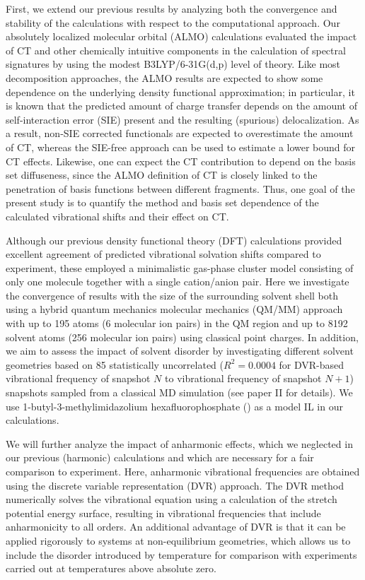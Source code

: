 \documentclass[%
  class = book,%
  crop = false,%
  float = true,%
  multi = true,%
  preview = false,%
]{standalone}
\begin{document}
First, we extend our previous results by analyzing both the convergence and stability of the calculations with respect to the computational approach. Our absolutely localized molecular orbital (ALMO) calculations\cite{Khaliullin2006,Khaliullin2007,Khaliullin2008} evaluated the impact of CT and other chemically intuitive components in the calculation of spectral signatures by using the modest B3LYP/6-31G(d,p) level of theory. Like most decomposition approaches, the ALMO results are expected to show some dependence on the underlying density functional approximation; in particular, it is known that the predicted amount of charge transfer depends on the amount of self-interaction error (SIE) present and the resulting (spurious) delocalization\cite{Ramos-Cordoba2011}. As a result, non-SIE corrected functionals are expected to overestimate the amount of CT, whereas the SIE-free \hf{} approach can be used to estimate a lower bound for CT effects. Likewise, one can expect the CT contribution to depend on the basis set diffuseness, since the ALMO definition of CT is closely linked to the penetration of basis functions between different fragments. Thus, one goal of the present study is to quantify the method and basis set dependence of the calculated vibrational shifts and their effect on CT.

Although our previous density functional theory (DFT) calculations provided excellent agreement of predicted vibrational solvation shifts compared to experiment, these employed a minimalistic gas-phase cluster model consisting of only one  molecule together with a single cation/anion pair. Here we investigate the convergence of results with the size of the surrounding solvent shell both using a hybrid quantum mechanics molecular mechanics (QM/MM) approach with up to \num{195} atoms (\num{6} molecular ion pairs) in the QM region and up to \num{8192} solvent atoms (\num{256} molecular ion pairs) using classical point charges. In addition, we aim to assess the impact of solvent disorder by investigating different solvent geometries based on \num{85} statistically uncorrelated (\(R^2 = 0.0004\) for DVR-based vibrational frequency of snapshot \(N\) to vibrational frequency of snapshot \(N+1\)) snapshots sampled from a classical MD simulation (see paper II\cite{Daly2016} for details). We use 1-butyl-3-methylimidazolium hexafluorophosphate (\ce{[C4C1im][PF6]}) as a model IL in our calculations.

We will further analyze the impact of anharmonic effects, which we neglected in our previous (harmonic) calculations and which are necessary for a fair comparison to experiment. Here, anharmonic vibrational frequencies are obtained using the discrete variable representation (DVR) approach. The DVR method numerically solves the vibrational \schrod{} equation using a calculation of the  stretch potential energy surface, resulting in vibrational frequencies that include anharmonicity to all orders. An additional advantage of DVR is that it can be applied rigorously to systems at non-equilibrium geometries, which allows us to include the disorder introduced by temperature for comparison with experiments carried out at temperatures above absolute zero.
\end{document}
